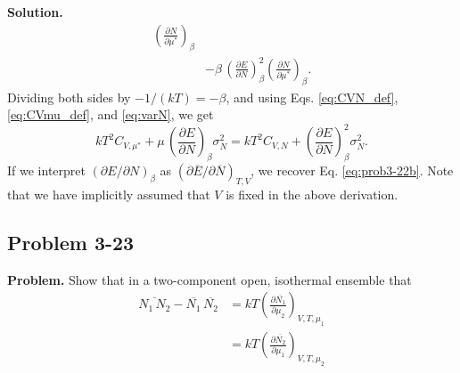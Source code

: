\documentclass[twocolumn, 10pt]{article}
\numberwithin{equation}{section}
\newenvironment{problem}
{\par\medskip\sffamily \color{problue}
  \textbf{Problem. }\ignorespaces}
{\medskip}
\newenvironment{solution}
{\par\medskip
  \textbf{Solution. }\ignorespaces}
{\medskip}
\begin{document}
\begin{solution}
\begin{align*}
  \left( \frac{ \partial N } {\partial \mu^* } \right)_{\beta}
  \\
  &-
  \beta \,
  \left( \frac{ \partial E } {\partial N } \right)_{\beta}^2
  \left( \frac{ \partial N } {\partial \mu^* } \right)_{\beta}
  .
\end{align*}
%
Dividing both sides by $-1/(k T) = -\beta$,
and using Eqs. \eqref{eq:CVN_def}, \eqref{eq:CVmu_def}, and \eqref{eq:varN},
we get
$$
  k T^2 C_{V, \mu^*}
  +
  \mu \,
  \left( \frac{ \partial E } {\partial N } \right)_{\beta}
  \sigma_N^2
  =
  k T^2 C_{V, N}
  +
  \left( \frac{ \partial E } {\partial N } \right)_{\beta}^2
  \sigma_N^2
  .
$$
If we interpret
$\left( \partial E / \partial N \right)_{\beta}$
as
$\left( \partial \overline E / \partial \overline N \right)_{T, V}$,
we recover Eq. \eqref{eq:prob3-22b}.
Note that we have implicitly assumed that $V$ is fixed in the above derivation.
\end{solution}




\subsection{Problem 3-23}

\begin{problem}
Show that in a two-component open, isothermal ensemble that
  \begin{align*}
    \overline{ N_1 \, N_2 }
    - \overline{N_1} \, \overline{N_2}
    &=
    kT \left(
      \frac{ \partial \overline{ N_1 } }
           { \partial \mu_2 }
      \right)_{V, T, \mu_1}
    \\
    &=
    kT \left(
      \frac{ \partial \overline{ N_2 } }
           { \partial \mu_1 }
      \right)_{V, T, \mu_2}
  \end{align*}
\end{problem}
\end{document}
